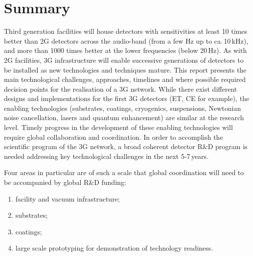 \chapter{Summary}
\label{sec:Summary}


Third generation facilities will house detectors with sensitivities at least 10 times better than 2G detectors across the audio-band (from a few Hz up to  ca.\,10\,kHz), and more than 1000 times better at the lower frequencies (below 20\,Hz). As with 2G facilities, 3G infrastructure will enable successive generations of detectors to be installed as new technologies and techniques mature.  This report presents the main technological challenges, approaches, timelines and where possible required decision points for the realisation of a 3G network. While there exist different designs and implementations for the first 3G detectors (ET, CE for example), the enabling technologies (substrates, coatings, cryogenics, suspensions, Newtonian noise cancellation, lasers and quantum enhancement) are similar at the research level.  Timely progress in the development of these enabling technologies will require global collaboration and coordination. In order to accomplish the scientific program of the 3G network, a broad coherent detector R\&D program is needed addressing key technological challenges in the next 5-7\,years.   

Four areas in particular are of such a scale that global coordination will need to be accompanied by global R\&D funding: 

\begin{enumerate}
\item facility and vacuum infrastructure; 
\item substrates; 
\item coatings; 
\item large scale prototyping for demonstration of technology readiness. 
\end{enumerate}

